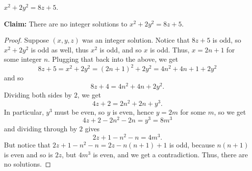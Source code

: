 \documentclass[11pt,dvipsnames]{book}
\numberwithin{equation}{section} %
\numberwithin{figure}{section} %
\numberwithin{table}{section} %
\begin{document}
\begin{exercise}
 $x^2+2y^2=8z+5$. 


\begin{solution}

{\bf Claim:} There are no integer solutions to $x^2+2y^2=8z+5$. 

\begin{proof}
Suppose $(x,y,z)$ was an integer solution. Notice that $8z+5$ is odd, so $x^2+2y^2$ is odd as well, thus $x^2$ is odd, and so $x$ is odd. Thus, $x=2n+1$ for some integer $n$. Plugging that back into the above, we get 
\[
8z+5 =x^2+2y^2 = (2n+1)^2 +2y^2 = 4n^2 +4n+1 + 2y^2\]
and so
\[
8z+4 = 4n^2+4n+2y^2.\]
Dividing both sides by $2$, we get
\[
4z+2=2n^2+2n+y^3.\]
In particular, $y^3$ must be even, so $y$ is even, hence $y=2m$ for some $m$, so we get
\[
4z+2-2n^2-2n=y^3=8m^3
\]
and dividing through by $2$ gives
\[
2z+1-n^2-n = 4m^3.\]
But notice that $2z+1-n^2-n = 2z-n(n+1)+1$ is odd, because $n(n+1)$ is even and so is $2z$, but $4m^3$ is even, and we get a contradiction. Thus, there are no solutions.
\end{proof}
\end{solution}
\end{exercise}
\end{document}
